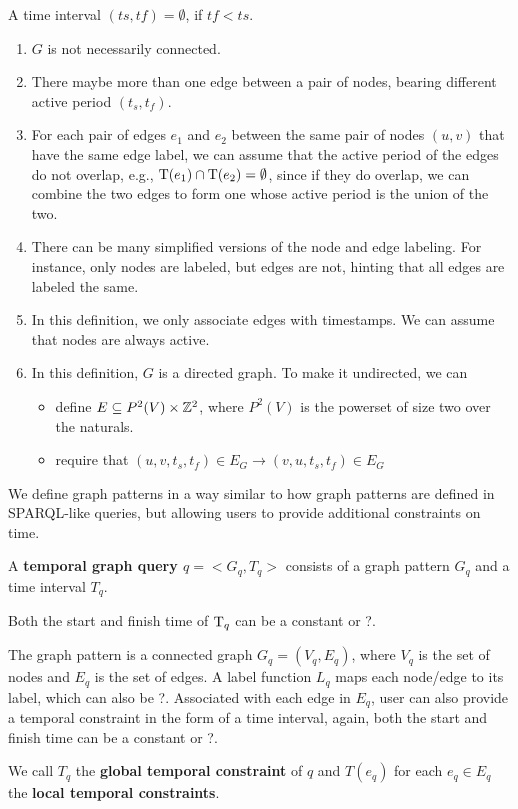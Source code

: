  A time interval $ (ts, tf) = \emptyset$, if $tf<ts$.
\SmallSpace


\begin{enumerate}
	\item $G$ is not necessarily connected. 
	
	\item There maybe more than one edge between a pair of nodes, bearing
          different active period $(t_s, t_f)$.
		
	\item For each pair of edges $e_1$ and $e_2$ between the same pair of
          nodes $(u,v)$ that have the same edge label, we can assume that the
          active period of the edges do not overlap, e.g., $\text{T}(e_1) \cap \text{T}(e_2)
          = \emptyset$, since if they do overlap, we can combine the two edges
          to form one whose active period is the union of the two.

	\item There can be many simplified versions of the node and edge
          labeling. For instance, only nodes are labeled, but edges are not,
          hinting that all edges are labeled the same.
	
	\item In this definition, we only associate edges with timestamps. We
          can assume that nodes are always active.
	
	\item In this definition, $G$ is a directed graph.  To make it
          undirected, we can
	\begin{itemize}
		\item define $E \subseteq P^2(V) \times \mathbb{Z}^2$, where $P^2(V)$ is
                  the powerset of size two over the naturals.
		\item require that $(u,v,t_s,t_f) \in E_G \rightarrow
                  (v,u,t_s,t_f) \in E_G$
	\end{itemize}
\end{enumerate}

We define graph patterns in a way similar to how graph patterns are defined in
SPARQL-like queries, but allowing users to provide additional constraints on
time.

\begin{defn}
  A {\bf temporal graph query $q = <G_q, T_q>$} consists of a graph pattern
  $G_q$ and a time interval $T_q$.

Both the start and finish time of $\text{T}_q$ can be a constant or ?.

The graph pattern is a connected graph $G_q = (V_q, E_q)$, where $V_q$ is the
set of nodes and $E_q$ is the set of edges. A label function $L_q$ maps each
node/edge to its label, which can also be ?. Associated with each edge in $E_q$,
user can also provide a temporal constraint in the form of a time interval,
again, both the start and finish time can be a constant or ?.

We call $T_q$ the {\bf global temporal constraint} of $q$ and $T(e_q)$ for each
$e_q \in E_q$ the {\bf local temporal constraints}.
\end{defn}

